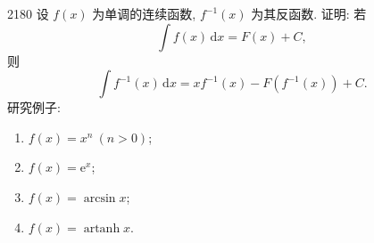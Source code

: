 \begin{prob}[L]{2180}
设 $f(x)$ 为单调的连续函数, $f^{-1}(x)$ 为其反函数. 证明: 若
\[
\int f(x) \,\mathrm{d}x = F(x) + C,
\]
则
\[
\int f^{-1}(x) \,\mathrm{d}x = x f^{-1}(x) - F(f^{-1}(x)) + C.
\]
研究例子:
\begin{enumerate}[label=(\alph*), itemsep=2pt, topsep=3pt]
  \item $f(x) = x^n \ (n > 0)$;
  \item $f(x) = \mathrm{e}^x$;
  \item $f(x) = \arcsin x$;
  \item $f(x) = \operatorname{artanh} x$.
\end{enumerate}
\end{prob}
